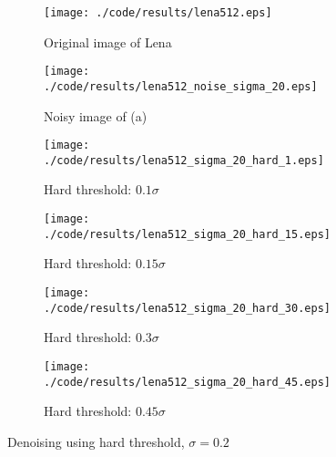 \documentclass[journal,comsoc]{IEEEtran}
\begin{document}
\begin{figure}[!hbt]
  \centering
  \begin{subfigure}{.25\textwidth}
    \centering
    \texttt{[image: ./code/results/lena512.eps]}
    \caption{Original image of Lena}
    \label{subfig:original-image-of-lena}
  \end{subfigure}%
  \begin{subfigure}{.25\textwidth}
    \centering
    \texttt{[image: ./code/results/lena512\_noise\_sigma\_20.eps]}
    \caption{Noisy image of (a)}
    \label{subfig:sigma-10-noisy-image-of-a}
  \end{subfigure}

  \begin{subfigure}{0.25\textwidth}
    \centering{}
    \texttt{[image: ./code/results/lena512\_sigma\_20\_hard\_1.eps]}
    \caption{Hard threshold: $0.1\sigma$}
  \end{subfigure}%
  \begin{subfigure}{.25\textwidth}
    \centering{}
    \texttt{[image: ./code/results/lena512\_sigma\_20\_hard\_15.eps]}
    \caption{Hard threshold: $0.15\sigma$}
  \end{subfigure}

  \begin{subfigure}{0.25\textwidth}
    \centering{}
    \texttt{[image: ./code/results/lena512\_sigma\_20\_hard\_30.eps]}
    \caption{Hard threshold: $0.3\sigma$}
  \end{subfigure}%
  \begin{subfigure}{.25\textwidth}
    \centering{}
    \texttt{[image: ./code/results/lena512\_sigma\_20\_hard\_45.eps]}
    \caption{Hard threshold: $0.45\sigma$}
  \end{subfigure}
  
  \caption{Denoising using hard threshold, $\sigma=0.2$}
  \label{fig:sigma-20-hard-threshold}
\end{figure}
\end{document}
